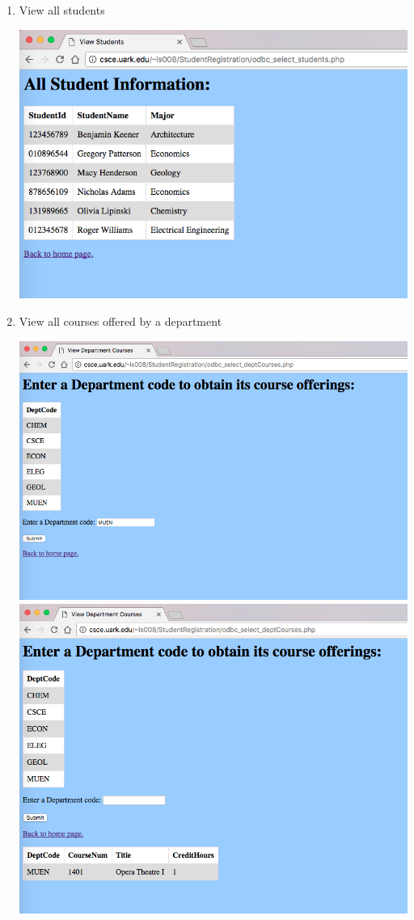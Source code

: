 \documentclass{article}      %
\begin{document}
\begin{enumerate}
\item View all students

	\includegraphics[width=\textwidth]{ViewStudents}


\item View all courses offered by a department

	\includegraphics[width=\textwidth]{ViewDepartmentCoursesBefore}
	\includegraphics[width=\textwidth]{ViewDepartmentCoursesAfter}



\end{enumerate}
\end{document}
